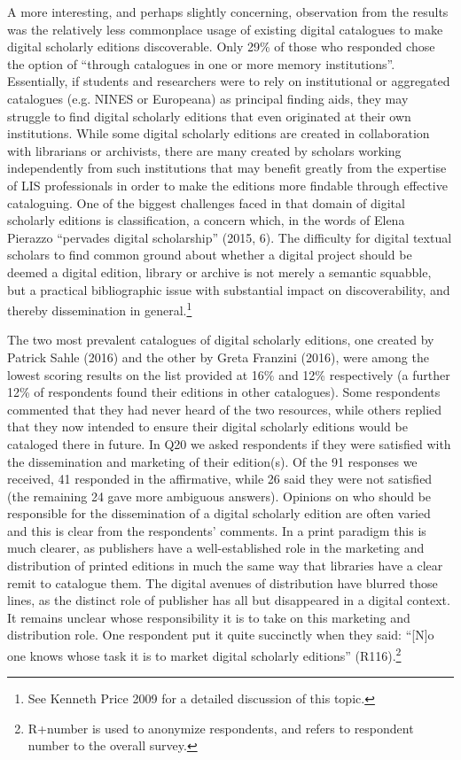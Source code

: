 \begin{paper}
A more interesting, and perhaps slightly concerning, observation from
the results was the relatively less commonplace usage of existing
digital catalogues to make digital scholarly editions discoverable. Only
29\% of those who responded chose the option of ``through catalogues in
one or more memory institutions''. Essentially, if students and
researchers were to rely on institutional or aggregated catalogues (e.g.
NINES or Europeana) as principal finding aids, they may struggle to find
digital scholarly editions that even originated at their own
institutions. While some digital scholarly editions are created in
collaboration with librarians or archivists, there are many created by
scholars working independently from such institutions that may benefit
greatly from the expertise of LIS professionals in order to make the
editions more findable through effective cataloguing. One of the biggest
challenges faced in that domain of digital scholarly editions is
classification, a concern which, in the words of Elena Pierazzo
``pervades digital scholarship'' (2015, 6). The difficulty for digital
textual scholars to find common ground about whether a digital project should
be deemed a digital edition, library or archive is not merely a semantic
squabble, but a practical bibliographic issue with substantial impact on
discoverability, and thereby dissemination in general.\footnote{See
  Kenneth Price 2009 for a detailed discussion of this topic.}

The two most prevalent catalogues of digital scholarly editions, one
created by Patrick Sahle (2016) and the other by Greta Franzini (2016),
were among the lowest scoring results on the list provided at 16\% and
12\% respectively (a further 12\% of respondents found their editions in
other catalogues). Some respondents commented that they had never heard
of the two resources, while others replied that they now intended to
ensure their digital scholarly editions would be cataloged there in
future. In Q20 we asked respondents if they were satisfied with the
dissemination and marketing of their edition(s). Of the 91 responses we
received, 41 responded in the affirmative, while 26 said they were not
satisfied (the remaining 24 gave more ambiguous answers). Opinions on
who should be responsible for the dissemination of a digital scholarly
edition are often varied and this is clear from the respondents'
comments. In a print paradigm this is much clearer, as publishers have a
well-established role in the marketing and distribution of printed
editions in much the same way that libraries have a clear remit to
catalogue them. The digital avenues of distribution have blurred those
lines, as the distinct role of publisher has all but disappeared in a
digital context. It remains unclear whose responsibility it is to take
on this marketing and distribution role. One respondent put it quite
succinctly when they said: ``{[}N{]}o one knows whose task it is to
market digital scholarly editions'' (R116).\footnote{R+number is used to
  anonymize respondents, and refers to respondent number to the overall
  survey.}


\end{paper}
